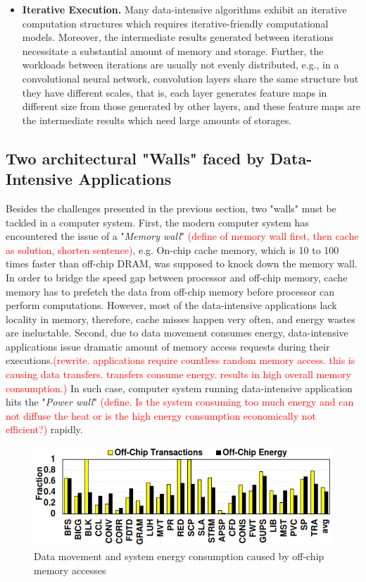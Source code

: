 \documentclass[letterpaper, 11pt, conference, margin=1in]{ieeeconf}   %
\newcommand\myworries[1]{\textcolor{red}{(#1)}}
\begin{document}
\begin{itemize}
  \item \textbf{Iterative Execution.} Many data-intensive algorithms exhibit an iterative computation structures which requires iterative-friendly computational models. Moreover, the intermediate results generated between iterations necessitate a substantial amount of memory and storage. Further, the workloads between iterations are usually not evenly distributed, e.g., in a convolutional neural network, convolution layers share the same structure but they have different scales, that is, each layer generates feature maps in different size from those generated by other layers, and these feature maps are the intermediate results which need large amounts of storages.
\end{itemize}

\subsection{\bf Two architectural "Walls" faced by Data-Intensive Applications}
Besides the challenges presented in the previous section, two "walls" must be tackled in a computer system. First, the modern computer system has encountered the issue of a "\textit{Memory wall}" \myworries{define of memory wall first, then cache as solution, shorten sentence}, e.g. On-chip cache memory, which is 10 to 100 times faster than off-chip DRAM, was supposed to knock down the memory wall. In order to bridge the speed gap between processor and off-chip memory, cache memory has to prefetch the data from off-chip memory before processor can perform computations. However, most of the data-intensive applications lack locality in memory, therefore, cache misses happen very often, and energy wastes are ineluctable. Second, due to data movement consumes energy, data-intensive applications issue dramatic amount of memory access requests during their executions.\myworries{rewrite. applications require countless random memory access. this is causing data transfers. transfers consume energy. results in high overall memory consumption.} In such case, computer system running data-intensive application hits the "\textit{Power wall}" \myworries{define. Is the system consuming too much energy and can not diffuse the heat or is the high energy consumption economically not efficient?} rapidly.

\begin{figure}[ht]
  \centering
  \includegraphics[scale=0.43]{figures/energy_consumption.png}
  \caption{Data movement and system energy consumption caused by off-chip memory accesses}
  \label{fig:power-consumption}
\end{figure}
\end{document}

